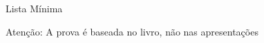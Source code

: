 \begin{frame}{Lista Mínima}

  \vfill
  Atenção: A prova é baseada no livro, não nas apresentações
\end{frame}


